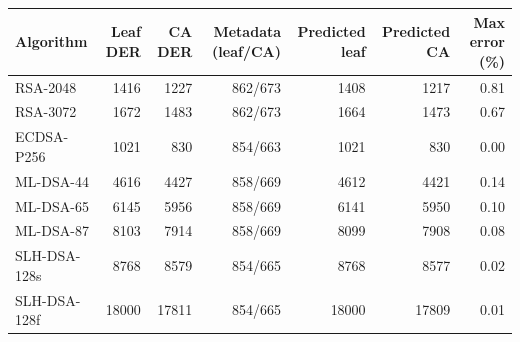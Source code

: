 \begin{tabular}{@{}lrrrrrr@{}}
\toprule
Algorithm & Leaf DER & CA DER & Metadata (leaf/CA) & Predicted leaf & Predicted CA & Max error (\%) \\
\midrule
RSA-2048 & 1416 & 1227 & 862/673 & 1408 & 1217 & 0.81 \\
RSA-3072 & 1672 & 1483 & 862/673 & 1664 & 1473 & 0.67 \\
ECDSA-P256 & 1021 & 830 & 854/663 & 1021 & 830 & 0.00 \\
ML-DSA-44 & 4616 & 4427 & 858/669 & 4612 & 4421 & 0.14 \\
ML-DSA-65 & 6145 & 5956 & 858/669 & 6141 & 5950 & 0.10 \\
ML-DSA-87 & 8103 & 7914 & 858/669 & 8099 & 7908 & 0.08 \\
SLH-DSA-128s & 8768 & 8579 & 854/665 & 8768 & 8577 & 0.02 \\
SLH-DSA-128f & 18000 & 17811 & 854/665 & 18000 & 17809 & 0.01 \\
\bottomrule
\end{tabular}
